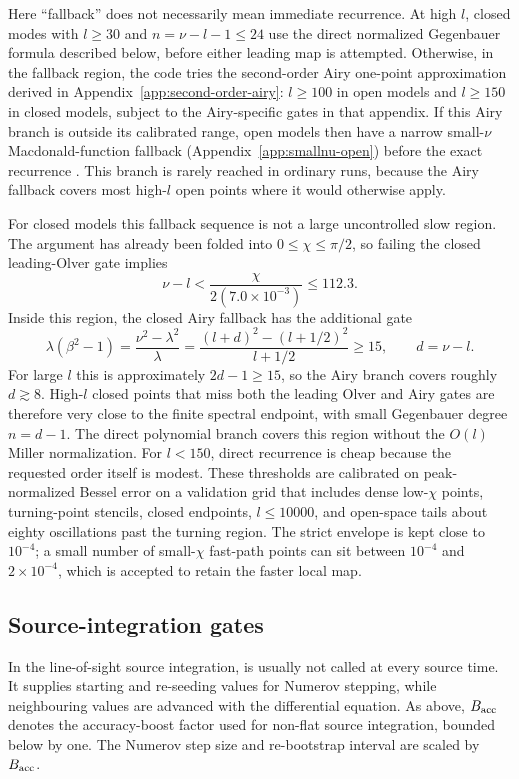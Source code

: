 \documentclass[11pt,a4paper]{article}
\newcommand{\code}[1]{\texttt{\detokenize{#1}}}
\begin{document}
Here ``fallback'' does not necessarily mean immediate recurrence.  At high
\(l\), closed modes with \(l\ge30\) and \(n=\nu-l-1\le24\) use the
direct normalized Gegenbauer formula described below, before either leading
map is attempted.  Otherwise, in the fallback region, the code tries the
second-order Airy one-point approximation
derived in Appendix~\ref{app:second-order-airy}: \(l\ge100\) in open models
and \(l\ge150\) in closed models, subject to the Airy-specific gates in that
appendix.  If this Airy branch is outside its calibrated range, open models
then have a narrow small-\(\nu\) Macdonald-function fallback
(Appendix~\ref{app:smallnu-open}) before the exact recurrence
\code{phi_recurs}.  This branch is rarely reached in ordinary runs, because the
Airy fallback covers most high-\(l\) open points where it would otherwise apply.

For closed models this fallback sequence is not a large uncontrolled slow
region.  The argument has already been folded into \(0\le\chi\le\pi/2\), so
failing the closed leading-Olver gate implies
\[
  \nu-l < \frac{\chi}{2(7.0\times10^{-3})}\le 112.3 .
\]
Inside this region, the closed Airy fallback has the additional gate
\[
  \lambda(\beta^2-1)=
  \frac{\nu^2-\lambda^2}{\lambda}
  =
  \frac{(l+d)^2-(l+1/2)^2}{l+1/2}
  \ge15,\qquad d=\nu-l .
\]
For large \(l\) this is approximately \(2d-1\ge15\), so the Airy branch covers
roughly \(d\gtrsim8\).  High-\(l\) closed points that miss both the leading
Olver and Airy gates are therefore very close to the finite spectral endpoint,
with small Gegenbauer degree \(n=d-1\).  The direct polynomial branch covers
this region without the \(O(l)\) Miller normalization.  For \(l<150\),
direct recurrence is cheap because the requested order itself is modest.
These thresholds are calibrated on peak-normalized Bessel error on a validation
grid that includes dense low-\(\chi\) points, turning-point stencils, closed
endpoints, \(l\le10000\), and open-space tails about eighty oscillations past the
turning region.  The strict envelope is kept close to \(10^{-4}\); a small number
of small-\(\chi\) fast-path points can sit between \(10^{-4}\) and
\(2\times10^{-4}\), which is accepted to retain the faster local map.

\subsection{Source-integration gates}

In the line-of-sight source integration, \code{u_olver} is usually not called at
every source time.  It supplies starting and re-seeding values for Numerov
stepping, while neighbouring values are advanced with the differential equation.
As above, \(B_{\rm acc}\) denotes the accuracy-boost factor used for non-flat
source integration, bounded below by one.  The Numerov step size and re-bootstrap
interval are scaled by \(B_{\rm acc}\).
\end{document}
